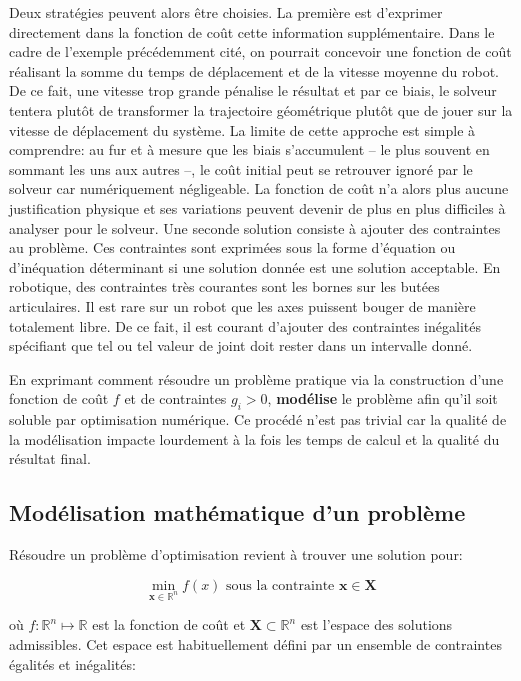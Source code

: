 Deux stratégies peuvent alors être choisies. La première est
d'exprimer directement dans la fonction de coût cette information
supplémentaire. Dans le cadre de l'exemple précédemment cité, on
pourrait concevoir une fonction de coût réalisant la somme du temps de
déplacement et de la vitesse moyenne du robot. De ce fait, une vitesse
trop grande pénalise le résultat et par ce biais, le solveur tentera
plutôt de transformer la trajectoire géométrique plutôt que de jouer
sur la vitesse de déplacement du système. La limite de cette approche
est simple à comprendre: au fur et à mesure que les biais s'accumulent
-- le plus souvent en sommant les uns aux autres --, le coût initial
peut se retrouver ignoré par le solveur car numériquement
négligeable. La fonction de coût n'a alors plus aucune justification
physique et ses variations peuvent devenir de plus en plus difficiles
à analyser pour le solveur.  Une seconde solution consiste à ajouter
des contraintes au problème. Ces contraintes sont exprimées sous la
forme d'équation ou d'inéquation déterminant si une solution donnée
est une solution acceptable. En robotique, des contraintes très
courantes sont les bornes sur les butées articulaires. Il est rare sur
un robot que les axes puissent bouger de manière totalement libre. De
ce fait, il est courant d'ajouter des contraintes inégalités
spécifiant que tel ou tel valeur de joint doit rester dans un
intervalle donné.


En exprimant comment résoudre un problème pratique via la construction
d'une fonction de coût $f$ et de contraintes $g_i > 0$,
\textbf{modélise} le problème afin qu'il soit soluble par optimisation
numérique. Ce procédé n'est pas trivial car la qualité de la
modélisation impacte lourdement à la fois les temps de calcul et la
qualité du résultat final.



\subsection{Modélisation mathématique d'un problème}


Résoudre un problème d'optimisation revient à trouver une solution pour:

\begin{equation}
  \min_{\mathbf{x} \in \mathbb{R}^n} f(x) \text{ sous la contrainte } \mathbf{x} \in \mathbf{X}
\end{equation}

où $f : \mathbb{R}^n \mapsto \mathbb{R}$ est la fonction de coût et
$\mathbf{X} \subset \mathbb{R}^n$ est l'espace des solutions
admissibles. Cet espace est habituellement défini par un ensemble de
contraintes égalités et inégalités:

